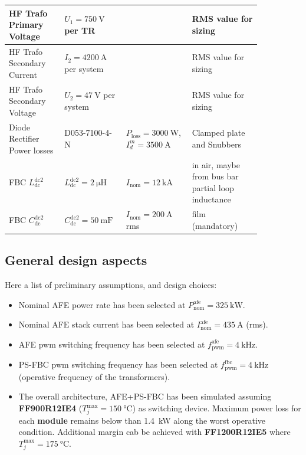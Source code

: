 \documentclass[11pt,a4paper]{scrartcl}
\begin{document}
\begin{onehalfspace}
\begin{center}
\begin{longtable}{p{0.2\linewidth}|p{0.2\linewidth}|p{0.2\linewidth}|p{0.25\linewidth}}
		\midrule
		HF Trafo Primary Voltage & $U_1 = \SI{750}{\volt}$ per TR &  &  RMS value for sizing \\		
		\midrule
		HF Trafo Secondary Current & $I_2 = \SI{4200}{\ampere}$ per system &  & RMS value for sizing \\
		\midrule
		HF Trafo Secondary Voltage & $U_2 = \SI{47}{\volt}$ per system &  & RMS value for sizing \\
		\midrule
		Diode Rectifier Power losses & D053-7100-4-N &   $P_\text{loss} =  \SI{3000}{\watt}$, $I_d^m = \SI{3500}{\ampere}$ & Clamped plate and Snubbers \\
		\midrule
		FBC $L_\text{dc}^\text{dc2}$ & $L_\text{dc}^\text{dc2} = \SI{2}{\micro\henry}$ & $I_\text{nom} = \SI{12}{\kilo\ampere}$ & in air, maybe from bus bar partial loop inductance \\
		\midrule
		FBC $C_\text{dc}^\text{dc2}$ & $C_\text{dc}^\text{dc2} = \SI{50}{\milli\farad}$ & $I_\text{nom} = \SI{200}{\ampere}$ rms & film (mandatory) \\
		\bottomrule
	\end{longtable}
\end{center}

\subsection{General design aspects}
Here a list of preliminary assumptions, and design choices:
\begin{itemize}
	\item[--] Nominal AFE power rate has been selected at $P_\text{nom}^\text{afe} = \SI{325}{\kilo\watt}$.
	\item[--] Nominal AFE stack current has been selected at $I_\text{nom}^\text{afe} = \SI{435}{\ampere}$ (rms).
	\item[--] AFE pwm switching frequency has been selected at $f_\text{pwm}^\text{afe} = \SI{4}{\kilo\hertz}$.
	\item[--] PS-FBC pwm switching frequency has been selected at $f_\text{pwm}^\text{fbc} = \SI{4}{\kilo\hertz}$ (operative frequency of the transformers).
	\item[--] The overall architecture, AFE+PS-FBC has been simulated assuming \textbf{FF900R12IE4} ($T_j^\text{max} = \SI{150}{\celsius}$) as switching device. Maximum power loss for each \textbf{module} remains below than \SI{1.4}{\kilo\watt} along the worst operative condition. Additional margin cab be achieved with \textbf{FF1200R12IE5} where $T_j^\text{max} = \SI{175}{\celsius}$.
\end{itemize}


\end{onehalfspace}
\end{document}
